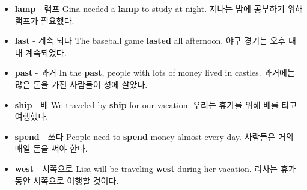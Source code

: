 \documentclass{article}
\begin{document}
\begin{addmargin}[1em]{1em}
\begin{itemize}
        \item \fontsize{12pt}{14pt}\selectfont \textbf{lamp} - 램프 \newline
        Gina needed a \textbf{lamp} to study at night. \newline
        지나는 밤에 공부하기 위해 램프가 필요했다.
        
        \item \fontsize{12pt}{14pt}\selectfont \textbf{last} - 계속 되다 \newline
        The baseball game \textbf{lasted} all afternoon. \newline
        야구 경기는 오후 내내 계속되었다.
        
        \item \fontsize{12pt}{14pt}\selectfont \textbf{past} - 과거 \newline
        In the \textbf{past}, people with lots of money lived in castles. \newline
        과거에는 많은 돈을 가진 사람들이 성에 살았다.
        
        \item \fontsize{12pt}{14pt}\selectfont \textbf{ship} - 배 \newline
        We traveled by \textbf{ship} for our vacation. \newline
        우리는 휴가를 위해 배를 타고 여행했다.
        
        \item \fontsize{12pt}{14pt}\selectfont \textbf{spend} - 쓰다 \newline
        People need to \textbf{spend} money almost every day. \newline
        사람들은 거의 매일 돈을 써야 한다.

        \item \fontsize{12pt}{14pt}\selectfont \textbf{west} - 서쪽으로 \newline
        Lisa will be traveling \textbf{west} during her vacation. \newline
        리사는 휴가 동안 서쪽으로 여행할 것이다.
    \end{itemize}
\end{addmargin}

\newpage

\end{document}
